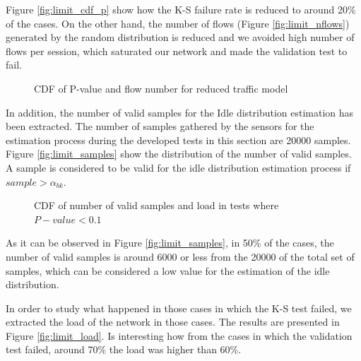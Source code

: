 Figure \ref{fig:limit_cdf_p} show how the \acs{K-S} failure rate is reduced to around 20\% of the cases. On the other hand, the number of flows (Figure \ref{fig:limit_nflows}) generated by the random distribution is reduced and we avoided high number of flows per session, which saturated our network and made the validation test to fail.

\begin{figure}[h]
	\centering
	\caption{CDF of P-value and flow number for reduced traffic model}
\end{figure}

In addition, the number of valid samples for the Idle distribution estimation has been extracted. The number of samples gathered by the sensors for the estimation process during the developed tests in this section are 20000 samples. Figure \ref{fig:limit_samples} show the distribution of the number of valid samples. A sample is considered to be valid for the idle distribution estimation process if $sample > \alpha_{bk}$.


\begin{figure}[ht]
	\centering
	\caption{CDF of number of valid samples and load in tests where $P-value<0.1$}
\end{figure}

As it can be observed in Figure \ref{fig:limit_samples}, in 50\% of the cases, the number of valid samples is around 6000 or less from the 20000 of the total set of samples, which can be considered a low value for the estimation of the idle distribution.

In order to study what happened in those cases in which the \acs{K-S} test failed, we extracted the load of the network in those cases. The results are presented in Figure \ref{fig:limit_load}. Is interesting how from the cases in which the validation test failed, around 70\% the load was higher than 60\%.

